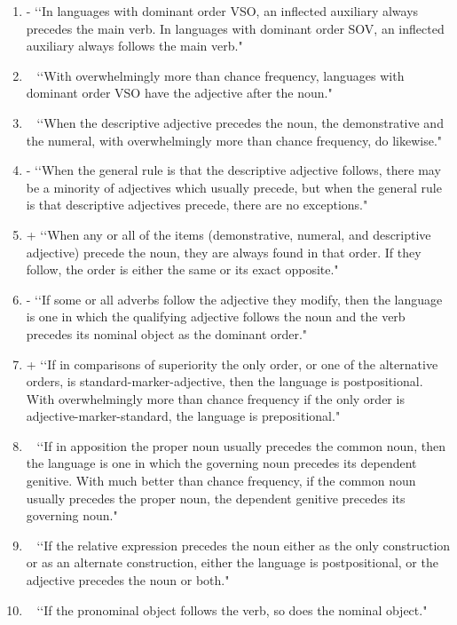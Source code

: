 \begin{enumerate}
\item -  \lq\lq In languages with dominant order VSO, an inflected auxiliary always precedes the main verb. In languages with dominant order SOV, an inflected auxiliary always follows the main verb." 

\item ~  \lq\lq With overwhelmingly more than chance frequency, languages with dominant order VSO have the adjective after the noun." 

\item ~  \lq\lq When the descriptive adjective precedes the noun, the demonstrative and the numeral, with overwhelmingly more than chance frequency, do likewise." 

\item -  \lq\lq When the general rule is that the descriptive adjective follows, there may be a minority of adjectives which usually precede, but when the general rule is that descriptive adjectives precede, there are no exceptions." 

\item +  \lq\lq When any or all of the items (demonstrative, numeral, and descriptive adjective) precede the noun, they are always found in that order. If they follow, the order is either the same or its exact opposite." 

\item -  \lq\lq If some or all adverbs follow the adjective they modify, then the language is one in which the qualifying adjective follows the noun and the verb precedes its nominal object as the dominant order." 

\item +  \lq\lq If in comparisons of superiority the only order, or one of the alternative orders, is standard-marker-adjective, then the language is postpositional. With overwhelmingly more than chance frequency if the only order is adjective-marker-standard, the language is prepositional." 

\item ~  \lq\lq If in apposition the proper noun usually precedes the common noun, then the language is one in which the governing noun precedes its dependent genitive. With much better than chance frequency, if the common noun usually precedes the proper noun, the dependent genitive precedes its governing noun." 

\item ~  \lq\lq If the relative expression precedes the noun either as the only construction or as an alternate construction, either the language is postpositional, or the adjective precedes the noun or both." 

\item ~  \lq\lq If the pronominal object follows the verb, so does the nominal object." 
\end{enumerate}

